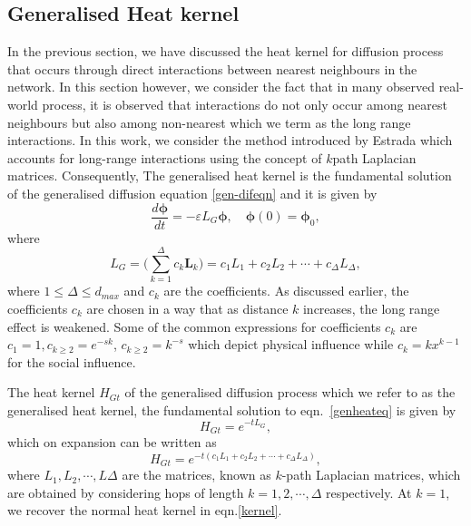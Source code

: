 \documentclass[10pt,a4paper]{article}
\begin{document}
        \subsection{Generalised Heat kernel}
        In the previous section, we have discussed the heat kernel for diffusion process that occurs through direct interactions between nearest neighbours in the network. In this section however, we consider the fact that in many observed real-world process, it is observed that interactions do not only occur among nearest neighbours but also among non-nearest which we term as the long range interactions. In this work, we consider the method introduced by Estrada \citep{estrada2012path} which accounts for long-range interactions using the concept of $k$path Laplacian matrices. Consequently, The generalised heat kernel is the fundamental solution of the generalised diffusion equation \ref{gen-difeqn} and it is given by
        \begin{equation}
        \frac{d\boldsymbol{\phi}}{dt} =  -\varepsilon L_{G} \boldsymbol{\phi}, \quad \boldsymbol{\phi}(0) = \boldsymbol{\phi}_0 ,
        \label{genheateq}
        \end{equation}
        where
        \begin{equation}
        L_{G} =  \Big(\sum_{k=1}^{\Delta}c_k\mathbf{L}_{k} \Big) = c_{1}L_{1} + c_{2}L_{2} + \cdots + c_{\Delta}L_{\Delta}, 
        \label{}
        \end{equation}
        where $1 \leq \Delta \leq d_{max}$ and $c_k$ are the coefficients. As discussed earlier, 
        the coefficients $c_k$  are chosen in a way that as distance $k$ increases, the long range effect is weakened. Some of the common expressions for coefficients $c_k$ are $c_1 =1, c_{k\geq 2} = e^{-s k}$, $ c_{k\geq 2} =k^{-s}$ which depict physical influence while $c_k = kx^{k-1}$ for the social influence.
        
        The heat kernel $H_{Gt}$ of the generalised diffusion process which we refer to as the generalised heat kernel, the fundamental solution to eqn.~\ref{genheateq} is given by 
        \begin{equation}
        H_{Gt} = e^{-t L_{G}},
        \end{equation}
        which on expansion can be written as 
        \begin{equation}
        H_{Gt} = e^{-t(c_{1}L_{1} + c_{2}L_{2} + \cdots + c_{\Delta}L_{\Delta})},
        \end{equation}
        where $L_1, L_2, \cdots, L{\Delta}$ are the matrices, known as $k$-path Laplacian matrices, which are obtained by considering hops of length $k=1,2,\cdots, \Delta$ respectively. At $k=1$, we recover the normal heat kernel in eqn.\ref{kernel}.
\end{document}
